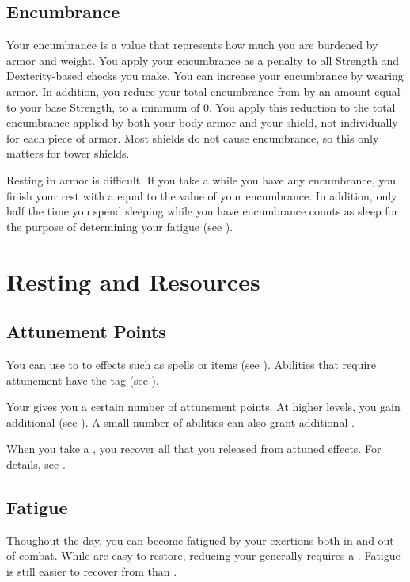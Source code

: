     \subsection{Encumbrance}\label{Encumbrance}
        Your encumbrance is a value that represents how much you are burdened by armor and weight.
        You apply your encumbrance as a penalty to all Strength and Dexterity-based checks you make.
        You can increase your encumbrance by wearing armor.
        In addition, you reduce your total encumbrance from  by an amount equal to your base Strength, to a minimum of 0.
        You apply this reduction to the total encumbrance applied by both your body armor and your shield, not individually for each piece of armor.
        Most shields do not cause encumbrance, so this only matters for tower shields.

        Resting in armor is difficult.
        If you take a  while you have any encumbrance, you finish your rest with a  equal to the value of your encumbrance.
        In addition, only half the time you spend sleeping while you have encumbrance counts as sleep for the purpose of determining your fatigue (see ).

\section{Resting and Resources}

    \subsection{Attunement Points}\label{Attunement Points}
        You can use  to  to effects such as spells or items (see ).
        Abilities that require attunement have the  tag (see ).

        Your  gives you a certain number of attunement points.
        At higher levels, you gain additional  (see ).
        A small number of abilities can also grant additional .

        When you take a , you recover all  that you released from attuned effects.
        For details, see .

    \subsection{Fatigue}\label{Fatigue}
        Thoughout the day, you can become fatigued by your exertions both in and out of combat.
        While  are easy to restore, reducing your  generally requires a .
        Fatigue is still easier to recover from than .

